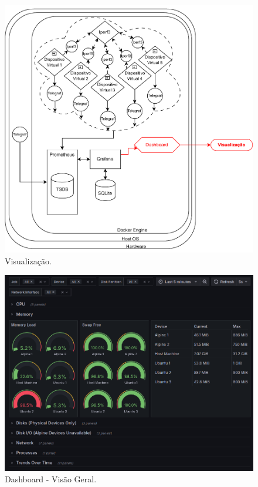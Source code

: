 \begin{figure}[ht]
\centering
\setlength{\abovecaptionskip}{-20pt}
\includegraphics[width=\textwidth]{Imagens/chap04/by-blocks/dashboard_diagram.pdf}
\caption{Visualização.}
\label{fig:DiagramaVisualizacao}
\end{figure}

\begin{figure}[H]
\centering
\color{red}
\setlength{\abovecaptionskip}{-20pt}
\includegraphics[width=\textwidth]{Imagens/chap04/dashboard/home.png}
\caption{Dashboard - Visão Geral.}
\label{fig:dashboard-home}
\end{figure}

